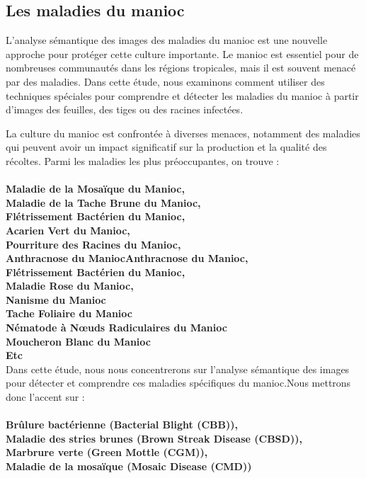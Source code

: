 \documentclass{article}
\begin{document}
	\subsection{Les maladies du manioc}
	\quad L'analyse sémantique des images des maladies du manioc est une nouvelle approche pour protéger cette culture importante. Le manioc est essentiel pour de nombreuses communautés dans les régions tropicales, mais il est souvent menacé par des maladies. Dans cette étude, nous examinons comment utiliser des techniques spéciales pour comprendre et détecter les maladies du manioc à partir d'images des feuilles, des tiges ou des racines infectées.
	
	\quad La culture du manioc est confrontée à diverses menaces, notamment des maladies qui peuvent avoir un impact significatif sur la production et la qualité des récoltes. Parmi les maladies les plus préoccupantes\cite{msikita_lutte_nodate}, on trouve : \\ \\
	\textemdash \textbf{  Maladie de la Mosaïque du Manioc, } \\
	\textemdash \textbf{ Maladie de la Tache Brune du Manioc, } \\
	\textemdash \textbf{ Flétrissement Bactérien du Manioc, } \\
	\textemdash \textbf{ Acarien Vert du Manioc, } \\
	\textemdash \textbf{  Pourriture des Racines du Manioc, } \\
	\textemdash \textbf{ Anthracnose du ManiocAnthracnose du Manioc, } \\
	\textemdash \textbf{ Flétrissement Bactérien du Manioc, } \\
	\textemdash \textbf{ Maladie Rose du Manioc, } \\
	\textemdash \textbf{ Nanisme du Manioc } \\
	\textemdash \textbf{ Tache Foliaire du Manioc } \\	
	\textemdash \textbf{ Nématode à Nœuds Radiculaires du Manioc } \\	
	\textemdash \textbf{ Moucheron Blanc du Manioc } \\	
	\textemdash \textbf{ Etc } \\	
	
	Dans cette étude, nous nous concentrerons sur l'analyse sémantique des images pour détecter et comprendre ces maladies spécifiques du manioc.Nous mettrons donc l'accent sur : \\ \\
	\textemdash \textbf{ Brûlure bactérienne (Bacterial Blight (CBB)), } \\
	\textemdash \textbf{ Maladie des stries brunes (Brown Streak Disease (CBSD)), } \\
	\textemdash \textbf{ Marbrure verte (Green Mottle (CGM)), } \\
	\textemdash \textbf{ Maladie de la mosaïque (Mosaic Disease (CMD)) } \\
	
\end{document}
